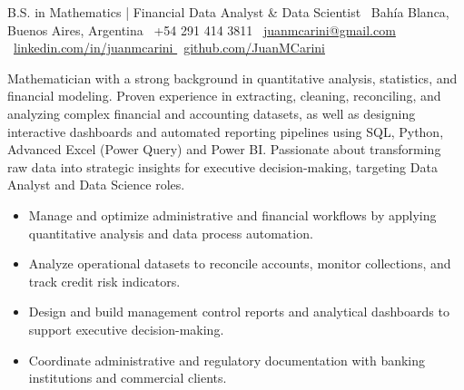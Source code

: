 \documentclass[english]{CV_template}
\begin{document}
{B.S. in Mathematics | Financial Data Analyst \& Data Scientist}
{
    \faMapMarker\ Bahía Blanca, Buenos Aires, Argentina \quad \textbar \quad
    \faPhone\ +54 291 414 3811 \quad \textbar \quad
    \faEnvelope\ \href{mailto:juanmcarini@gmail.com}{juanmcarini@gmail.com} \\[2.5pt]
    \faLinkedinSquare\ \href{https://www.linkedin.com/in/juanmcarini}{linkedin.com/in/juanmcarini {\footnotesize\faExternalLink}} \quad \textbar \quad
    \faGithub\ \href{https://github.com/JuanMCarini}{github.com/JuanMCarini {\footnotesize\faExternalLink}}
}

Mathematician with a strong background in quantitative analysis, statistics, and financial modeling. Proven experience in extracting, cleaning, reconciling, and analyzing complex financial and accounting datasets, as well as designing interactive dashboards and automated reporting pipelines using SQL, Python, Advanced Excel (Power Query) and Power BI. Passionate about transforming raw data into strategic insights for executive decision-making, targeting Data Analyst and Data Science roles.


\begin{itemize}
    \item Manage and optimize administrative and financial workflows by applying quantitative analysis and data process automation.
    \item Analyze operational datasets to reconcile accounts, monitor collections, and track credit risk indicators.
    \item Design and build management control reports and analytical dashboards to support executive decision-making.
    \item Coordinate administrative and regulatory documentation with banking institutions and commercial clients.
\end{itemize}
\end{document}
